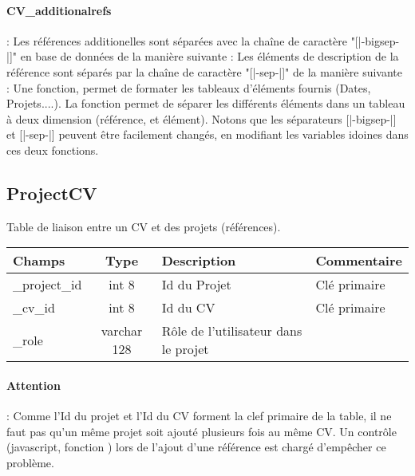 \paragraph{CV\_additionalrefs} : Les références additionelles sont séparées avec la chaîne de caractère "[|-bigsep-|]" en base de données de la manière suivante :
Les éléments de description de la référence sont séparés par la chaîne de caractère "[|-sep-|]" de la manière suivante :
\shadowbox{
\begin{minipage}{18cm}
\begin{verbatim}
	[Date][|-sep-|][Duree][|-sep-|][Projet][|-sep-|][Rôle][|-sep-|][Description][|-sep-|][Technique]
\end{verbatim}
\end{minipage}
}
Une fonction,  permet de formater les tableaux d'éléments fournis (Dates, Projets....).
La fonction  permet de séparer les différents éléments dans un tableau à deux dimension (référence, et élément).	
Notons que les séparateurs [|-bigsep-|] et [|-sep-|] peuvent être facilement changés, en modifiant les variables idoines dans ces deux fonctions.


\subsection{ProjectCV}
Table de liaison entre un CV et des projets (références).\\

\begin{tabular}{|p{3cm}|c|p{5.4cm}|p{2.6cm}|}
\hline
\textbf{Champs} & \textbf{Type} & \textbf{Description} & \textbf{Commentaire} \\
\hline
\_project\_id & int 8 & Id du Projet & Clé primaire \\
\hline
\_cv\_id & int 8 & Id du CV & Clé primaire \\
\hline
\_role & varchar 128 & Rôle de l'utilisateur dans le projet & \\
\hline
\end{tabular}

\paragraph{Attention} : Comme l'Id du projet et l'Id du CV forment la clef primaire de la table, il ne faut pas qu'un même projet soit ajouté plusieurs fois au même CV. Un contrôle (javascript, fonction ) lors de l'ajout d'une référence est chargé d'empêcher ce problème.

